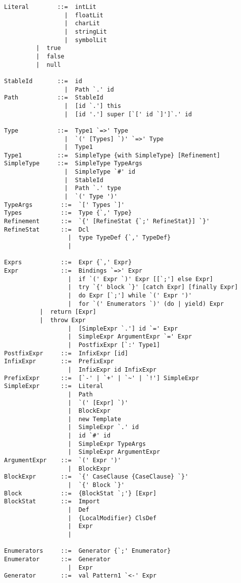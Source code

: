 \documentclass[a4paper,12pt,twoside,titlepage]{book}
\begin{document}
\begin{lstlisting}
  Literal        ::=  intLit
                   |  floatLit
                   |  charLit
                   |  stringLit
                   |  symbolLit
		   |  true
		   |  false
		   |  null

  StableId       ::=  id
                   |  Path `.' id
  Path           ::=  StableId
                   |  [id `.'] this
                   |  [id '.'] super [`[' id `]']`.' id

  Type           ::=  Type1 `=>' Type
                   |  `(' [Types] `)' `=>' Type
                   |  Type1
  Type1          ::=  SimpleType {with SimpleType} [Refinement]
  SimpleType     ::=  SimpleType TypeArgs
                   |  SimpleType `#' id
                   |  StableId
                   |  Path `.' type
                   |  `(' Type ')'
  TypeArgs        ::=  `[' Types `]'
  Types           ::=  Type {`,' Type}
  Refinement      ::=  `{' [RefineStat {`;' RefineStat}] `}'
  RefineStat      ::=  Dcl
                    |  type TypeDef {`,' TypeDef}
                    |

  Exprs           ::=  Expr {`,' Expr}
  Expr            ::=  Bindings `=>' Expr
                    |  if `(' Expr `)' Expr [[`;'] else Expr]
                    |  try `{' block `}' [catch Expr] [finally Expr]
                    |  do Expr [`;'] while `(' Expr ')'
                    |  for `(' Enumerators `)' (do | yield) Expr
		    |  return [Expr]
		    |  throw Expr
                    |  [SimpleExpr `.'] id `=' Expr
                    |  SimpleExpr ArgumentExpr `=' Expr
                    |  PostfixExpr [`:' Type1]
  PostfixExpr     ::=  InfixExpr [id]
  InfixExpr       ::=  PrefixExpr
                    |  InfixExpr id InfixExpr
  PrefixExpr      ::=  [`-' | `+' | `~' | `!'] SimpleExpr 
  SimpleExpr      ::=  Literal
                    |  Path
                    |  `(' [Expr] `)'
                    |  BlockExpr
                    |  new Template 
                    |  SimpleExpr `.' id 
                    |  id `#' id 
                    |  SimpleExpr TypeArgs
                    |  SimpleExpr ArgumentExpr
  ArgumentExpr    ::=  `(' Expr ')'
                    |  BlockExpr
  BlockExpr       ::=  `{' CaseClause {CaseClause} `}'
                    |  `{' Block `}'
  Block           ::=  {BlockStat `;'} [Expr]
  BlockStat       ::=  Import
                    |  Def
                    |  {LocalModifier} ClsDef
                    |  Expr
                    |

  Enumerators     ::=  Generator {`;' Enumerator}
  Enumerator      ::=  Generator
                    |  Expr
  Generator       ::=  val Pattern1 `<-' Expr


\end{lstlisting}
\end{document}
